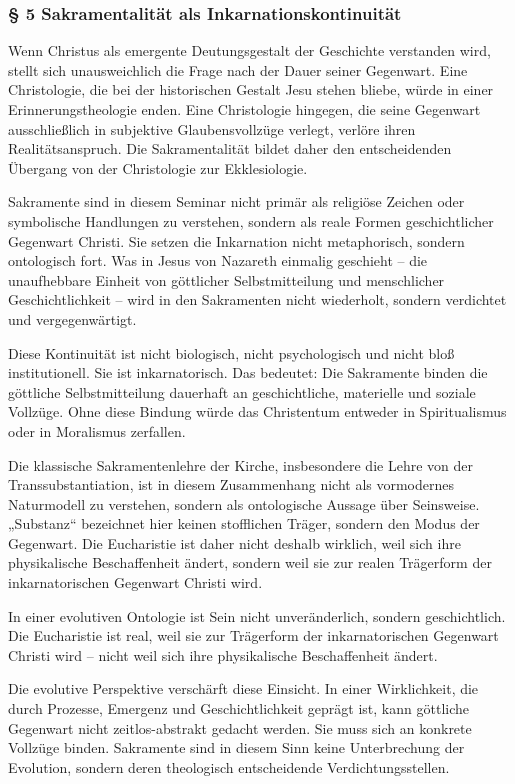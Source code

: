 \documentclass[
  ngerman,
]{article}
\begin{document}
\subsubsection{§ 5 Sakramentalität als
Inkarnationskontinuität}\label{sakramentalituxe4t-als-inkarnationskontinuituxe4t}

Wenn Christus als emergente Deutungsgestalt der Geschichte verstanden
wird, stellt sich unausweichlich die Frage nach der Dauer seiner
Gegenwart. Eine Christologie, die bei der historischen Gestalt Jesu
stehen bliebe, würde in einer Erinnerungstheologie enden. Eine
Christologie hingegen, die seine Gegenwart ausschließlich in subjektive
Glaubensvollzüge verlegt, verlöre ihren Realitätsanspruch. Die
Sakramentalität bildet daher den entscheidenden Übergang von der
Christologie zur Ekklesiologie.

Sakramente sind in diesem Seminar nicht primär als religiöse Zeichen
oder symbolische Handlungen zu verstehen, sondern als reale Formen
geschichtlicher Gegenwart Christi. Sie setzen die Inkarnation nicht
metaphorisch, sondern ontologisch fort. Was in Jesus von Nazareth
einmalig geschieht -- die unaufhebbare Einheit von göttlicher
Selbstmitteilung und menschlicher Geschichtlichkeit -- wird in den
Sakramenten nicht wiederholt, sondern verdichtet und vergegenwärtigt.

Diese Kontinuität ist nicht biologisch, nicht psychologisch und nicht
bloß institutionell. Sie ist inkarnatorisch. Das bedeutet: Die
Sakramente binden die göttliche Selbstmitteilung dauerhaft an
geschichtliche, materielle und soziale Vollzüge. Ohne diese Bindung
würde das Christentum entweder in Spiritualismus oder in Moralismus
zerfallen.

Die klassische Sakramentenlehre der Kirche, insbesondere die Lehre von
der Transsubstantiation, ist in diesem Zusammenhang nicht als
vormodernes Naturmodell zu verstehen, sondern als ontologische Aussage
über Seinsweise. „Substanz`` bezeichnet hier keinen stofflichen Träger,
sondern den Modus der Gegenwart. Die Eucharistie ist daher nicht deshalb
wirklich, weil sich ihre physikalische Beschaffenheit ändert, sondern
weil sie zur realen Trägerform der inkarnatorischen Gegenwart Christi
wird.

In einer evolutiven Ontologie ist Sein nicht unveränderlich, sondern
geschichtlich. Die Eucharistie ist real, weil sie zur Trägerform der
inkarnatorischen Gegenwart Christi wird -- nicht weil sich ihre
physikalische Beschaffenheit ändert.

Die evolutive Perspektive verschärft diese Einsicht. In einer
Wirklichkeit, die durch Prozesse, Emergenz und Geschichtlichkeit geprägt
ist, kann göttliche Gegenwart nicht zeitlos-abstrakt gedacht werden. Sie
muss sich an konkrete Vollzüge binden. Sakramente sind in diesem Sinn
keine Unterbrechung der Evolution, sondern deren theologisch
entscheidende Verdichtungsstellen.
\end{document}
